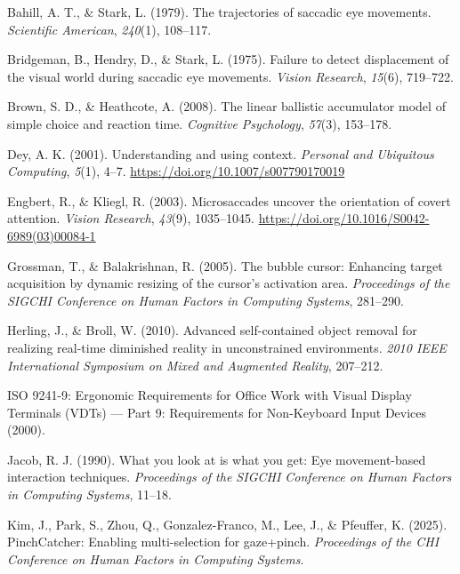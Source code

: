 \documentclass[
  11pt,
  11pt,
  letterpaper]{article}
\newlength{\cslhangindent}
\newenvironment{CSLReferences}[2] %
 {\begin{list}{}{%
  \setlength{\itemindent}{0pt}
  \setlength{\leftmargin}{0pt}
  \setlength{\parsep}{0pt}
  \ifodd #1
   \setlength{\leftmargin}{\cslhangindent}
   \setlength{\itemindent}{-1\cslhangindent}
  \fi
  \setlength{\itemsep}{#2\baselineskip}}}
 {\end{list}}
\begin{document}
\label{refs}
\begin{CSLReferences}{1}{0}
Bahill, A. T., \& Stark, L. (1979). The trajectories of saccadic eye
movements. \emph{Scientific American}, \emph{240}(1), 108--117.

Bridgeman, B., Hendry, D., \& Stark, L. (1975). Failure to detect
displacement of the visual world during saccadic eye movements.
\emph{Vision Research}, \emph{15}(6), 719--722.

Brown, S. D., \& Heathcote, A. (2008). The linear ballistic accumulator
model of simple choice and reaction time. \emph{Cognitive Psychology},
\emph{57}(3), 153--178.

Dey, A. K. (2001). Understanding and using context. \emph{Personal and
Ubiquitous Computing}, \emph{5}(1), 4--7.
\url{https://doi.org/10.1007/s007790170019}

Engbert, R., \& Kliegl, R. (2003). Microsaccades uncover the orientation
of covert attention. \emph{Vision Research}, \emph{43}(9), 1035--1045.
\url{https://doi.org/10.1016/S0042-6989(03)00084-1}

Grossman, T., \& Balakrishnan, R. (2005). The bubble cursor: Enhancing
target acquisition by dynamic resizing of the cursor's activation area.
\emph{Proceedings of the SIGCHI Conference on Human Factors in Computing
Systems}, 281--290.

Herling, J., \& Broll, W. (2010). Advanced self-contained object removal
for realizing real-time diminished reality in unconstrained
environments. \emph{2010 IEEE International Symposium on Mixed and
Augmented Reality}, 207--212.

ISO 9241-9: Ergonomic Requirements for Office Work with Visual Display
Terminals (VDTs) --- Part 9: Requirements for Non-Keyboard Input Devices
(2000).

Jacob, R. J. (1990). What you look at is what you get: Eye
movement-based interaction techniques. \emph{Proceedings of the SIGCHI
Conference on Human Factors in Computing Systems}, 11--18.

Kim, J., Park, S., Zhou, Q., Gonzalez-Franco, M., Lee, J., \& Pfeuffer,
K. (2025). PinchCatcher: Enabling multi-selection for gaze+pinch.
\emph{Proceedings of the CHI Conference on Human Factors in Computing
Systems}.


\end{CSLReferences}
\end{document}
